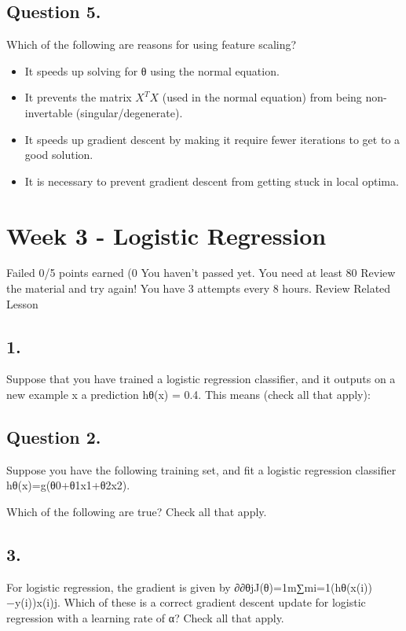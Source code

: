 \subsection{ Question 5.} 
Which of the following are reasons for using feature scaling?

\begin{itemize}
\item It speeds up solving for θ using the normal equation.
\item It prevents the matrix $X^TX$ (used in the normal equation) from being non-invertable (singular/degenerate).
\item It speeds up gradient descent by making it require fewer iterations to get to a good solution.
\item It is necessary to prevent gradient descent from getting stuck in local optima.
\end{itemize}

\newpage
\section{Week 3 - Logistic Regression}

Failed
0/5 points earned (0%
You haven't passed yet. You need at least 80%
Review the material and try again!  You have 3 attempts every 8 hours.
Review Related Lesson


\subsection{ 1. }
Suppose that you have trained a logistic regression classifier, and it outputs on a new example x a prediction hθ(x) = 0.4. This means (check all that apply):

\subsection{Question 2. }
Suppose you have the following training set, and fit a logistic regression classifier hθ(x)=g(θ0+θ1x1+θ2x2).



Which of the following are true? Check all that apply.


\subsection{ 3. }
For logistic regression, the gradient is given by ∂∂θjJ(θ)=1m∑mi=1(hθ(x(i))−y(i))x(i)j. Which of these is a correct gradient descent update for logistic regression with a learning rate of α? Check all that apply.


